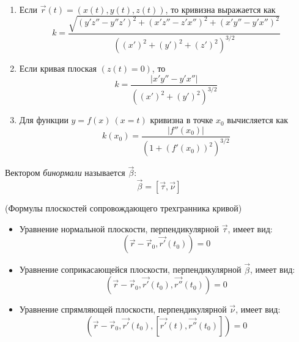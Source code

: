 \begin{corollary}~
	\begin{enumerate}
		\item Если $\vec{r}(t) = (x(t), y(t), z(t))$, то кривизна выражается как
		\[
			k = \frac{\sqrt{(y'z'' - y''z')^2 + (x'z'' - z'x'')^2 + (x'y'' - y'x'')^2}}{\left((x')^2 + (y')^2 + (z')^2\right)^{3/2}}
		\]
		
		\item Если кривая плоская $(z(t) = 0)$, то
		\[
			k = \frac{|x'y'' - y'x''|}{\left((x')^2 + (y')^2\right)^{3/2}}
		\]
		
		\item Для функции $y = f(x)\ (x = t)$ кривизна в точке $x_0$ вычисляется как
		\[
			k(x_0) = \frac{|f''(x_0)|}{\left(1 + (f'(x_0))^2\right)^{3/2}}
		\]
	\end{enumerate}
\end{corollary}

\begin{definition}
	Вектором \textit{бинормали} называется $\vec{\beta}$:
	\[
		\vec{\beta} = [\vec{\tau}, \vec{\nu}]
	\]
\end{definition}


\begin{theorem} (Формулы плоскостей сопровождающего трехгранника кривой)
	\begin{itemize}
		\item Уравнение нормальной плоскости, перпендикулярной $\vec{\tau}$, имеет вид:
		\[
			(\vec{r} - \vec{r}_0, \vec{r'}(t_0)) = 0
		\]
		
		\item Уравнение соприкасающейся плоскости, перпендикулярной $\vec{\beta}$, имеет вид:
		\[
			(\vec{r} - \vec{r}_0, \vec{r'}(t_0), \vec{r''}(t_0)) = 0
		\]
		
		\item Уравнение спрямляющей плоскости, перпендикулярной $\vec{\nu}$, имеет вид:
		\[
			\left(\vec{r} - \vec{r}_0, \vec{r'}(t_0), \left[\vec{r'}(t), \vec{r''}(t_0)\right]\right) = 0
		\]
	\end{itemize}
\end{theorem}

